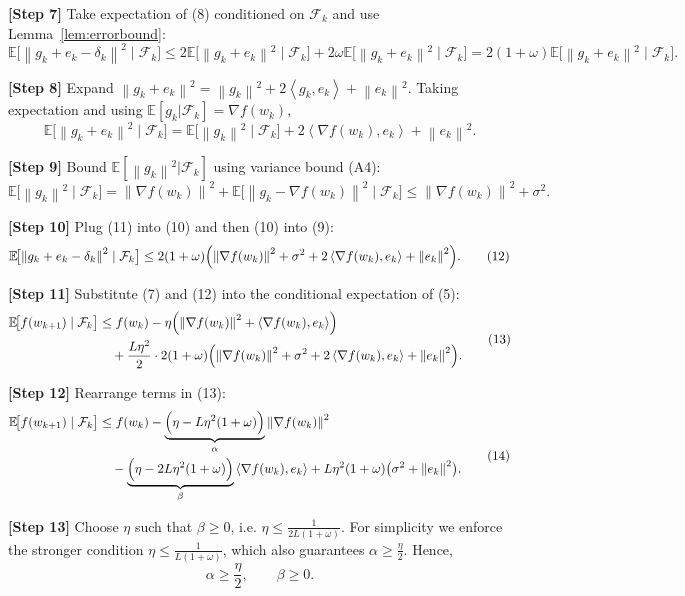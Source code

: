\documentclass{article}
\newcommand{\E}{\mathbb{E}}
\newcommand{\norm}[1]{\left\lVert #1\right\rVert}
\newcommand{\ip}[2]{\left\langle #1,#2\right\rangle}
\begin{document}
\noindent\textbf{[Step 7]} Take expectation of (8) conditioned on $\mathcal{F}_k$ and use Lemma~\ref{lem:errorbound}:
\[
\E\!\bigl[\norm{g_k+e_k-\delta_k}^2\mid\mathcal{F}_k\bigr]
\le 2\E\!\bigl[\norm{g_k+e_k}^2\mid\mathcal{F}_k\bigr]
+2\omega\E\!\bigl[\norm{g_k+e_k}^2\mid\mathcal{F}_k\bigr]
=2(1+\omega)\E\!\bigl[\norm{g_k+e_k}^2\mid\mathcal{F}_k\bigr].
\tag{9}
\]

\noindent\textbf{[Step 8]} Expand $\norm{g_k+e_k}^2 = \norm{g_k}^2 + 2\ip{g_k}{e_k} + \norm{e_k}^2$.
Taking expectation and using $\E[g_k|\mathcal{F}_k]=\nabla f(w_k)$,
\[
\E\!\bigl[\norm{g_k+e_k}^2\mid\mathcal{F}_k\bigr]
= \E\!\bigl[\norm{g_k}^2\mid\mathcal{F}_k\bigr] + 2\ip{\nabla f(w_k)}{e_k} + \norm{e_k}^2 .
\tag{10}
\]

\noindent\textbf{[Step 9]} Bound $\E[\norm{g_k}^2|\mathcal{F}_k]$ using variance bound (A4):
\[
\E\!\bigl[\norm{g_k}^2\mid\mathcal{F}_k\bigr]
= \norm{\nabla f(w_k)}^2 + \E\!\bigl[\norm{g_k-\nabla f(w_k)}^2\mid\mathcal{F}_k\bigr]
\le \norm{\nabla f(w_k)}^2 + \sigma^2 .
\tag{11}
\]

\noindent\textbf{[Step 10]} Plug (11) into (10) and then (10) into (9):
\[
\E\!\bigl[\norm{g_k+e_k-\delta_k}^2\mid\mathcal{F}_k\bigr]
\le 2(1+\omega)\Bigl(\norm{\nabla f(w_k)}^2+\sigma^2
+2\ip{\nabla f(w_k)}{e_k}+\norm{e_k}^2\Bigr).
\tag{12}
\]

\noindent\textbf{[Step 11]} Substitute (7) and (12) into the conditional expectation of (5):
\[
\begin{aligned}
\E\!\bigl[f(w_{k+1})\mid\mathcal{F}_k\bigr]
&\le f(w_k)-\eta\Bigl(\norm{\nabla f(w_k)}^2+\ip{\nabla f(w_k)}{e_k}\Bigr)\\
&\quad+\frac{L\eta^2}{2}\cdot 2(1+\omega)\Bigl(\norm{\nabla f(w_k)}^2+\sigma^2
+2\ip{\nabla f(w_k)}{e_k}+\norm{e_k}^2\Bigr) .
\end{aligned}
\tag{13}
\]

\noindent\textbf{[Step 12]} Rearrange terms in (13):
\[
\begin{aligned}
\E\!\bigl[f(w_{k+1})\mid\mathcal{F}_k\bigr]
&\le f(w_k)
-\underbrace{\Bigl(\eta - L\eta^2(1+\omega)\Bigr)}_{\alpha}\norm{\nabla f(w_k)}^2\\
&\quad -\underbrace{\Bigl(\eta - 2L\eta^2(1+\omega)\Bigr)}_{\beta}\ip{\nabla f(w_k)}{e_k}
+L\eta^2(1+\omega)\bigl(\sigma^2+\norm{e_k}^2\bigr) .
\end{aligned}
\tag{14}
\]

\noindent\textbf{[Step 13]} Choose $\eta$ such that $\beta\ge 0$, i.e.
$\eta\le \frac{1}{2L(1+\omega)}$.  For simplicity we enforce the stronger condition
$\eta\le \frac{1}{L(1+\omega)}$, which also guarantees $\alpha\ge \frac{\eta}{2}$.
Hence,
\[
\alpha\ge \frac{\eta}{2},\qquad \beta\ge 0 .
\tag{15}
\]
\end{document}
